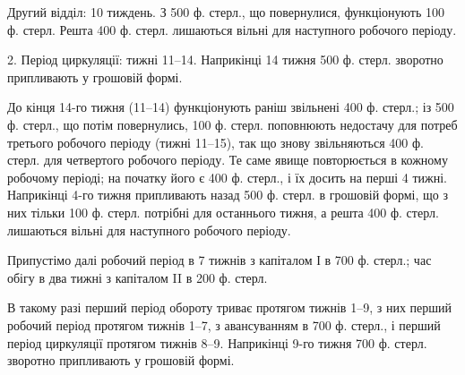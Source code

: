 Другий відділ: 10 тиждень. З 500 ф. стерл., що повернулися, функціонують
100 ф. стерл. Решта 400 ф. стерл. лишаються вільні для наступного
робочого періоду.

2. Період циркуляції: тижні 11--14. Наприкінці 14 тижня 500 ф.
стерл. зворотно припливають у грошовій формі.

До кінця 14-го тижня (11--14) функціонують раніш звільнені 400 ф.
стерл.; із 500 ф. стерл., що потім повернулись, 100 ф. стерл. поповнюють
недостачу для потреб третього робочого періоду (тижні 11--15),
так що знову звільняються 400 ф. стерл. для четвертого робочого періоду.
Те саме явище повторюється в кожному робочому періоді; на
початку його є 400 ф. стерл., і їх досить на перші 4 тижні. Наприкінці
4-го тижня припливають назад 500 ф. стерл. в грошовій формі, що з
них тільки 100 ф. стерл. потрібні для останнього тижня, а решта 400 ф.
стерл. лишаються вільні для наступного робочого періоду.

Припустімо далі робочий період в 7 тижнів з капіталом І в 700 ф.
стерл.; час обігу в два тижні з капіталом II в 200 ф. стерл.

В такому разі перший період обороту триває протягом тижнів 1--9,
з них перший робочий період протягом тижнів 1--7, з авансуванням
в 700 ф. стерл., і перший період циркуляції протягом тижнів 8--9. Наприкінці
9-го тижня 700 ф. стерл. зворотно припливають у грошовій формі.
